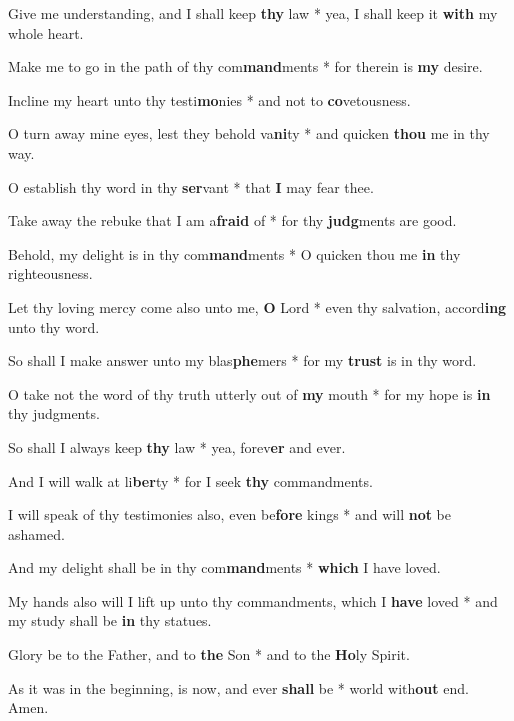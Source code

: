 \begin{multicols}{2}
	Give me understanding, and I shall keep \textbf{thy} law * yea, I shall keep it \textbf{with} my whole heart.
	
	Make me to go in the path of thy com\textbf{mand}ments * for therein is \textbf{my} desire.
	
	Incline my heart unto thy testi\textbf{mo}nies * and not to \textbf{co}vetousness.
	
	O turn away mine eyes, lest they behold va\textbf{ni}ty * and quicken \textbf{thou} me in thy way.
	
	O establish thy word in thy \textbf{ser}vant * that \textbf{I} may fear thee.
	
	Take away the rebuke that I am a\textbf{fraid} of * for thy \textbf{judg}ments are good.
	
	Behold, my delight is in thy com\textbf{mand}ments * O quicken thou me \textbf{in} thy righteousness.
	
	Let thy loving mercy come also unto me, \textbf{O} Lord * even thy salvation, accord\textbf{ing} unto thy word.
	
	So shall I make answer unto my blas\textbf{phe}mers * for my \textbf{trust} is in thy word.
	
	O take not the word of thy truth utterly out of \textbf{my} mouth * for my hope is \textbf{in} thy judgments.
	
	So shall I always keep \textbf{thy} law * yea, forev\textbf{er} and ever.
	
	And I will walk at li\textbf{ber}ty * for I seek \textbf{thy} commandments.
	
	I will speak of thy testimonies also, even be\textbf{fore} kings * and will \textbf{not} be ashamed.
	
	And my delight shall be in thy com\textbf{mand}ments * \textbf{which} I have loved.
	
	My hands also will I lift up unto thy commandments, which I \textbf{have} loved * and my study shall be \textbf{in} thy statues.
	
	Glory be to the Father, and to \textbf{the} Son * and to the \textbf{Ho}ly Spirit.
	
	As it was in the beginning, is now, and ever \textbf{shall} be * world with\textbf{out} end. Amen.
\end{multicols}